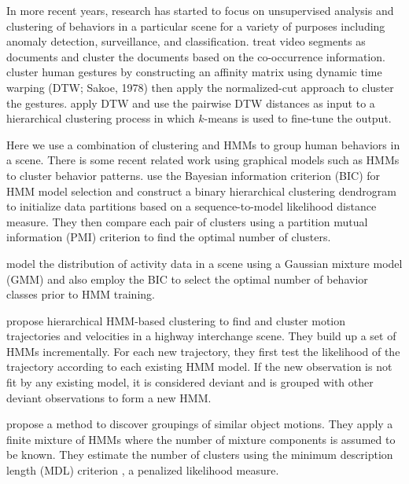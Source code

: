 In more recent years, research has started to focus on unsupervised
analysis and clustering of behaviors in a particular scene for a
variety of purposes including anomaly detection, surveillance, and
classification.  treat video segments as
documents and cluster the documents based on the co-occurrence
information.  cluster human gestures by
constructing an affinity matrix using dynamic time warping (DTW;
Sakoe, 1978)\nocite{sakoe78dtw} then apply the normalized-cut approach
to cluster the gestures.  apply DTW
and use the pairwise DTW distances as input to a hierarchical
clustering process in which $k$-means is used to fine-tune the output.

Here we use a combination of clustering and HMMs to group
human behaviors in a scene. There is some recent related work using
graphical models such as HMMs to cluster behavior
patterns.  use the Bayesian information
criterion (BIC) for HMM model selection and construct a binary
hierarchical clustering dendrogram to initialize data partitions based
on a sequence-to-model likelihood distance measure. They then compare
each pair of clusters using a partition mutual information (PMI)
criterion  to find the optimal number of
clusters.

 model the distribution of
activity data in a scene using a Gaussian mixture model (GMM) and also
employ the BIC to select the optimal number of behavior classes prior
to HMM training.

 propose hierarchical HMM-based clustering
to find and cluster motion trajectories and velocities in a highway
interchange scene. They build up a set of HMMs incrementally. For each
new trajectory, they first test the likelihood of the trajectory
according to each existing HMM model.  If the new observation is not
fit by any existing model, it is considered deviant and is grouped
with other deviant observations to form a new HMM.

 propose a method to discover groupings of
similar object motions. They apply a finite mixture of HMMs where the
number of mixture components is assumed to be known. They estimate the
number of clusters using the minimum description length (MDL)
criterion , a penalized likelihood measure.

